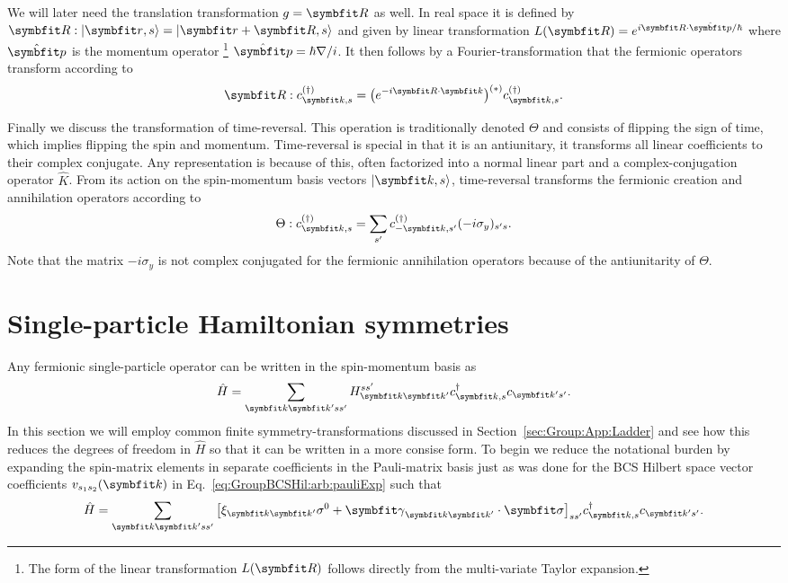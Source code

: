 We will later need the translation transformation $g=\v{R}$ as well. In real space it is defined by $\v{R}:\ket{\v{r},s} = \ket{\v{r}+\v{R},s}$
and given by linear transformation $L(\v{R}) = e^{i\v{R}\cdot\hat{\v{p}}/\hbar}$ where $\hat{\v{p}}$ is the momentum operator%
\footnote{The form of the linear transformation $L(\v{R})$ follows directly from the multi-variate Taylor expansion.} $\hat{\v{p}} = \hbar\nabla/i$.
It then follows by a Fourier-transformation that the fermionic operators transform according to
\begin{equation}
    \label{eq:Group:App:Ladder:translation}
    \v{R}:c^{(\dagger)}_{\v{k},s} = \big(e^{-i\v{R}\cdot\v{k}}\big)^{(\ast)}c^{(\dagger)}_{\v{k},s}.
\end{equation}

Finally we discuss the transformation of time-reversal. This operation is traditionally denoted $\Theta$ and consists of flipping the sign of
time, which implies flipping the spin and momentum. Time-reversal is special in that it is an antiunitary, \ie it transforms all linear coefficients
to their complex conjugate. Any representation is
because of this, often factorized into a normal linear part and a complex-conjugation operator $\hat{K}$. From its action on the
spin-momentum basis vectors $\ket{\v{k},s}$, time-reversal transforms the fermionic creation and annihilation operators according to
\begin{equation}
    \label{eq:Group:App:Ladder:timeReversal}
    \Theta:c^{(\dagger)}_{\v{k},s} = \sum_{s'}c^{(\dagger)}_{-\v{k},s'}(-i\sigma_y)_{s's}.
\end{equation}
Note that the matrix $-i\sigma_y$ is not complex conjugated for the fermionic annihilation operators because of the antiunitarity of $\Theta$.


\section{Single-particle Hamiltonian symmetries}

Any fermionic single-particle operator can be written in the spin-momentum basis as
\begin{equation}
    \label{eq:Group:Single:generalHamiltonian}
    \hat{H} = \sum_{\v{k}\v{k}'ss'}H^{ss'}_{\v{k}\v{k}'}c^{\dagger}_{\v{k},s}c_{\v{k}'s'}.
\end{equation}
In this section we will employ common finite symmetry-transformations discussed in Section~\ref{sec:Group:App:Ladder} and see how this reduces the degrees
of freedom in $\hat{H}$ so that it can be written in a more consise form. To begin we reduce the notational burden by expanding the spin-matrix
elements in separate coefficients in the Pauli-matrix basis just as was done for the BCS Hilbert space vector coefficients $v_{s_1s_2}(\v{k})$ in
Eq.~\eqref{eq:GroupBCSHil:arb:pauliExp} such that
\begin{equation}
    \label{eq:Group:Single:pauliMatrices}
    \hat{H} = \sum_{\v{k}\v{k}'ss'}\big[\xi_{\v{k}\v{k}'}\sigma^0 + \v{\gamma}_{\v{k}\v{k}'}\cdot\v{\sigma}\big]_{ss'}c^{\dagger}_{\v{k},s}c_{\v{k}'s'}.
\end{equation}

